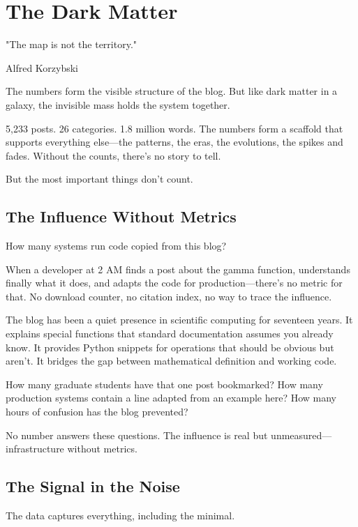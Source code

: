 \chapter{The Dark Matter}

\epigraph{"The map is not the territory."}{Alfred Korzybski}

\bigskip

The numbers form the visible structure of the blog. But like dark matter in a galaxy, the invisible mass holds the system together.

5,233 posts. 26 categories. 1.8 million words. The numbers form a scaffold that supports everything else—the patterns, the eras, the evolutions, the spikes and fades. Without the counts, there's no story to tell.

But the most important things don't count.

\bigskip

\section*{The Influence Without Metrics}

How many systems run code copied from this blog?

When a developer at 2 AM finds a post about the gamma function, understands finally what it does, and adapts the code for production—there's no metric for that. No download counter, no citation index, no way to trace the influence.

The blog has been a quiet presence in scientific computing for seventeen years. It explains special functions that standard documentation assumes you already know. It provides Python snippets for operations that should be obvious but aren't. It bridges the gap between mathematical definition and working code.

How many graduate students have that one post bookmarked? How many production systems contain a line adapted from an example here? How many hours of confusion has the blog prevented?

No number answers these questions. The influence is real but unmeasured—infrastructure without metrics.

\bigskip

\section*{The Signal in the Noise}

The data captures everything, including the minimal.

